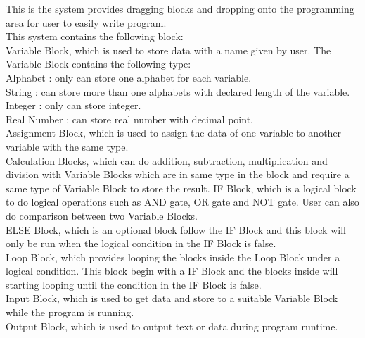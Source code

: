This is the system provides dragging blocks and dropping onto the programming area for user to easily write program.\\
This system contains the following block:\\
	Variable Block, which is used to store data with a name given by user. The Variable Block contains the following type:\\
		Alphabet : only can store one alphabet for each variable.\\
		String : can store more than one alphabets with declared length of the variable.\\
		Integer : only can store integer.\\
		Real Number : can store real number with decimal point.\\
	Assignment Block, which is used to assign the data of one variable to another variable with the same type.\\
	Calculation Blocks, which can do addition, subtraction, multiplication and division with Variable Blocks which are in same type in the block and require a same type of Variable Block to store the result.
	IF Block, which is a logical block to do logical operations such as AND gate, OR gate and NOT gate. User can also do comparison between two Variable Blocks.\\
	ELSE Block, which is an optional block follow the IF Block and this block will only be run when the logical condition in the IF Block is false.\\
	Loop Block, which provides looping the blocks inside the Loop Block under a logical condition. This block begin with a IF Block and the blocks inside will starting looping until the condition in the IF Block is false.\\
	Input Block, which is used to get data and store to a suitable Variable Block while the program is running.\\
	Output Block, which is used to output text or data during program runtime.\\
